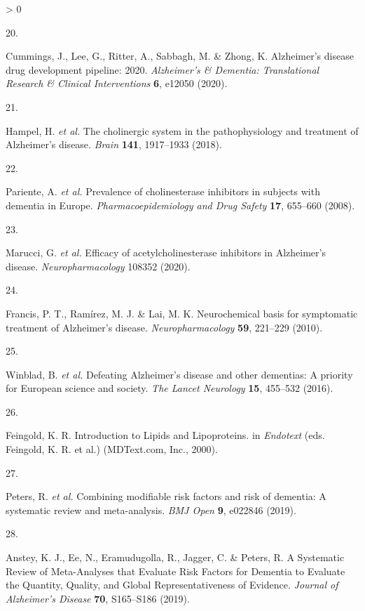 \documentclass[a4paper, twoside]{templates/ociamthesis}
\newlength{\cslhangindent}
\newlength{\csllabelwidth}
\newenvironment{CSLReferences}[3] %
 {%
  \setlength{\parindent}{0pt}
  \ifodd #1 \everypar{\setlength{\hangindent}{\cslhangindent}}\ignorespaces\fi
  \ifnum #2 > 0
  \setlength{\parskip}{#2\baselineskip}
  \fi
 }%
 {}
\newcommand{\CSLLeftMargin}[1]{\parbox[t]{\maxof{\widthof{#1}}{\csllabelwidth}}{#1}}
\newcommand{\CSLRightInline}[1]{\parbox[t]{\linewidth - \csllabelwidth}{#1}}
\begin{document}
\begin{CSLReferences}{0}{0}
\leavevmode\hypertarget{ref-cummings2020}{}%
\CSLLeftMargin{20. }
\CSLRightInline{Cummings, J., Lee, G., Ritter, A., Sabbagh, M. \& Zhong, K. Alzheimer's disease drug development pipeline: 2020. \emph{Alzheimer's \& Dementia: Translational Research \& Clinical Interventions} \textbf{6}, e12050 (2020).}

\leavevmode\hypertarget{ref-hampel2018}{}%
\CSLLeftMargin{21. }
\CSLRightInline{Hampel, H. \emph{et al.} The cholinergic system in the pathophysiology and treatment of {Alzheimer}'s disease. \emph{Brain} \textbf{141}, 1917--1933 (2018).}

\leavevmode\hypertarget{ref-pariente2008}{}%
\CSLLeftMargin{22. }
\CSLRightInline{Pariente, A. \emph{et al.} Prevalence of cholinesterase inhibitors in subjects with dementia in {Europe}. \emph{Pharmacoepidemiology and Drug Safety} \textbf{17}, 655--660 (2008).}

\leavevmode\hypertarget{ref-marucci2020}{}%
\CSLLeftMargin{23. }
\CSLRightInline{Marucci, G. \emph{et al.} Efficacy of acetylcholinesterase inhibitors in {Alzheimer}'s disease. \emph{Neuropharmacology} 108352 (2020).}

\leavevmode\hypertarget{ref-francis2010}{}%
\CSLLeftMargin{24. }
\CSLRightInline{Francis, P. T., Ramírez, M. J. \& Lai, M. K. Neurochemical basis for symptomatic treatment of {Alzheimer}'s disease. \emph{Neuropharmacology} \textbf{59}, 221--229 (2010).}

\leavevmode\hypertarget{ref-winblad2016}{}%
\CSLLeftMargin{25. }
\CSLRightInline{Winblad, B. \emph{et al.} Defeating {Alzheimer}'s disease and other dementias: A priority for {European} science and society. \emph{The Lancet Neurology} \textbf{15}, 455--532 (2016).}

\leavevmode\hypertarget{ref-feingold2000}{}%
\CSLLeftMargin{26. }
\CSLRightInline{Feingold, K. R. Introduction to {Lipids} and {Lipoproteins}. in \emph{Endotext} (eds. Feingold, K. R. et al.) ({MDText.com, Inc.}, 2000).}

\leavevmode\hypertarget{ref-peters2019}{}%
\CSLLeftMargin{27. }
\CSLRightInline{Peters, R. \emph{et al.} Combining modifiable risk factors and risk of dementia: A systematic review and meta-analysis. \emph{BMJ Open} \textbf{9}, e022846 (2019).}

\leavevmode\hypertarget{ref-anstey2019}{}%
\CSLLeftMargin{28. }
\CSLRightInline{Anstey, K. J., Ee, N., Eramudugolla, R., Jagger, C. \& Peters, R. A {Systematic Review} of {Meta}-{Analyses} that {Evaluate Risk Factors} for {Dementia} to {Evaluate} the {Quantity}, {Quality}, and {Global Representativeness} of {Evidence}. \emph{Journal of Alzheimer's Disease} \textbf{70}, S165--S186 (2019).}


\end{CSLReferences}
\end{document}
